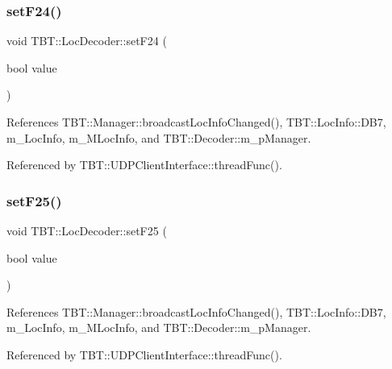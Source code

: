 \subsubsection{\texorpdfstring{set\+F24()}{setF24()}}
{\footnotesize\ttfamily void T\+B\+T\+::\+Loc\+Decoder\+::set\+F24 (\begin{DoxyParamCaption}\item[{bool}]{value }\end{DoxyParamCaption})\hspace{0.3cm}{\ttfamily [inline]}}



References T\+B\+T\+::\+Manager\+::broadcast\+Loc\+Info\+Changed(), T\+B\+T\+::\+Loc\+Info\+::\+D\+B7, m\+\_\+\+Loc\+Info, m\+\_\+\+M\+Loc\+Info, and T\+B\+T\+::\+Decoder\+::m\+\_\+p\+Manager.



Referenced by T\+B\+T\+::\+U\+D\+P\+Client\+Interface\+::thread\+Func().

\mbox{\label{classTBT_1_1LocDecoder_aafefc743964ea0b01ff3ad51fee98033_aafefc743964ea0b01ff3ad51fee98033}} 
\subsubsection{\texorpdfstring{set\+F25()}{setF25()}}
{\footnotesize\ttfamily void T\+B\+T\+::\+Loc\+Decoder\+::set\+F25 (\begin{DoxyParamCaption}\item[{bool}]{value }\end{DoxyParamCaption})\hspace{0.3cm}{\ttfamily [inline]}}



References T\+B\+T\+::\+Manager\+::broadcast\+Loc\+Info\+Changed(), T\+B\+T\+::\+Loc\+Info\+::\+D\+B7, m\+\_\+\+Loc\+Info, m\+\_\+\+M\+Loc\+Info, and T\+B\+T\+::\+Decoder\+::m\+\_\+p\+Manager.



Referenced by T\+B\+T\+::\+U\+D\+P\+Client\+Interface\+::thread\+Func().

\mbox{\label{classTBT_1_1LocDecoder_a646c6edc6515dadaebac9b06a0907a9e_a646c6edc6515dadaebac9b06a0907a9e}} 
